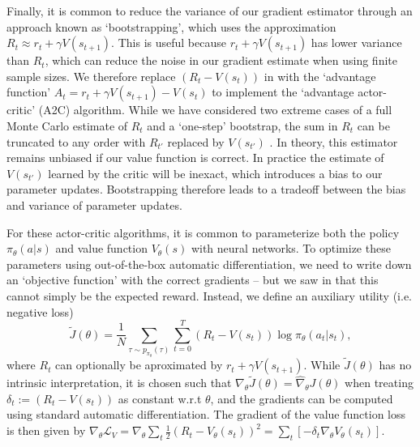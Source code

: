 Finally, it is common to reduce the variance of our gradient estimator through an approach known as `bootstrapping', which uses the approximation $R_t \approx r_t + \gamma V(s_{t+1})$.
This is useful because $r_t + \gamma V(s_{t+1})$ has lower variance than $R_t$, which can reduce the noise in our gradient estimate when using finite sample sizes.
We therefore replace $(R_t - V(s_t))$ in  with the `advantage function' $A_t = r_t + \gamma V(s_{t+1}) - V(s_t)$ to implement the `advantage actor-critic' (A2C) algorithm.
While we have considered two extreme cases of a full Monte Carlo estimate of $R_t$ and a `one-step' bootstrap, the sum in $R_t$ can be truncated to any order with $R_{t'}$ replaced by $V(s_{t'})$ \citep{sutton2018reinforcement}.
In theory, this estimator remains unbiased if our value function is correct.
In practice the estimate of $V(s_{t'})$ learned by the critic will be inexact, which introduces a bias to our parameter updates.
Bootstrapping therefore leads to a tradeoff between the bias and variance of parameter updates.

For these actor-critic algorithms, it is common to parameterize both the policy $\pi_\theta(a|s)$ and value function $V_\theta(s)$ with neural networks.
To optimize these parameters using out-of-the-box automatic differentiation, we need to write down an `objective function' with the correct gradients -- but we saw in  that this cannot simply be the expected reward.
Instead, we define an auxiliary utility (i.e. negative loss)
\begin{equation}
    \label{eq:Jtilde}
    \tilde{J}(\theta) = \frac{1}{N} \sum_{\tau \sim p_{\pi_\theta}(\tau)}  \sum_{t=0}^T (R_t - V(s_t)) \log \pi_\theta (a_t|s_t),
\end{equation}
where $R_t$ can optionally be aproximated by $r_t + \gamma V(s_{t+1})$.
While $\tilde{J}(\theta)$ has no intrinsic interpretation, it is chosen such that $\nabla_\theta \tilde{J}(\theta) = \hat{\nabla}_\theta J(\theta)$ when treating $\delta_t := (R_t - V(s_t))$ as constant w.r.t $\theta$, and the gradients can be computed using standard automatic differentiation.
The gradient of the value function loss is then given by $\nabla_\theta \mathcal{L}_V = \nabla_\theta \sum_t \frac12  (R_t - V_\theta(s_t))^2 = \sum_t \left [ - \delta_t \nabla_\theta V_\theta(s_t) \right ]$.




